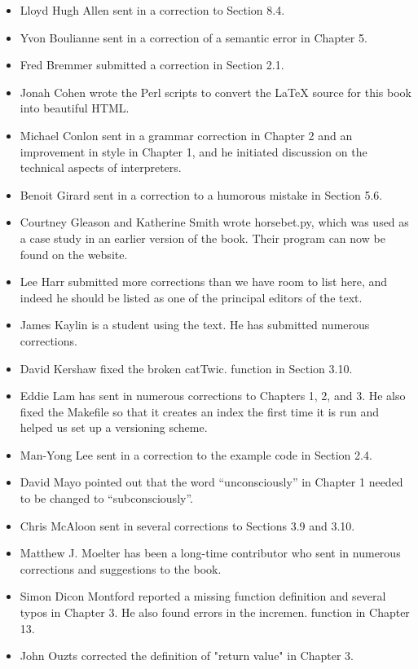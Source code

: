 \begin{itemize}
\item Lloyd Hugh Allen sent in a correction to Section 8.4. 
\item Yvon Boulianne sent in a correction of a semantic error in Chapter 5. 
\item Fred Bremmer submitted a correction in Section 2.1. 
\item Jonah Cohen wrote the Perl scripts to convert the LaTeX source for this
book into beautiful HTML.
\item Michael Conlon sent in a grammar correction in Chapter 2 and an
improvement in style in Chapter 1, and he initiated discussion on the technical
aspects of interpreters.
\item Benoit Girard sent in a correction to a humorous mistake in Section 5.6. 
\item Courtney Gleason and Katherine Smith wrote horsebet.py, which was used as
a case study in an earlier version of the book. Their program can now be found
on the website.
\item Lee Harr submitted more corrections than we have room to list here, and
indeed he should be listed as one of the principal editors of the text.
\item James Kaylin is a student using the text. He has submitted numerous
corrections.
\item David Kershaw fixed the broken catTwic. 
function in Section 3.10. 
\item Eddie Lam has sent in numerous corrections to Chapters 1, 2, and 3. He also fixed the Makefile 
so that it creates an index the first time it is run and helped us set up a versioning scheme. 
\item Man-Yong Lee sent in a correction to the example code in Section 2.4. 
\item David Mayo pointed out that the word ``unconsciously'' in Chapter 1 needed
to be changed to ``subconsciously''. 
\item Chris McAloon sent in several corrections to Sections 3.9 and 3.10. 
\item Matthew J. Moelter has been a long-time contributor who sent in numerous corrections and 
suggestions to the book. 
\item Simon Dicon Montford reported a missing function definition and several typos in Chapter 3. 
He also found errors in the incremen. 
function in Chapter 13. 
\item John Ouzts corrected the definition of "return value" in Chapter 3. 

\end{itemize}
